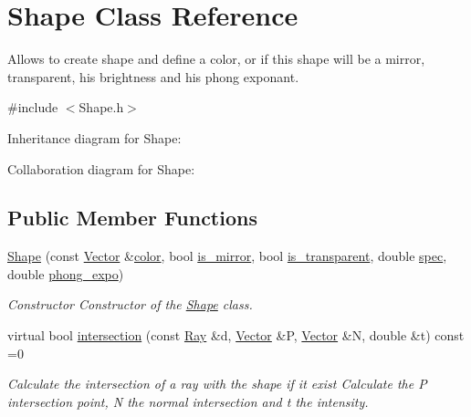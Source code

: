 \hypertarget{classShape}{}\section{Shape Class Reference}
\label{classShape}


Allows to create shape and define a color, or if this shape will be a mirror, transparent, his brightness and his phong exponant.  




{\ttfamily \#include $<$Shape.\+h$>$}



Inheritance diagram for Shape\+:


Collaboration diagram for Shape\+:
\subsection*{Public Member Functions}
\begin{DoxyCompactItemize}
\item 
\hyperlink{classShape_ac15c3dd4d56ded4efccf75f820cce913}{Shape} (const \hyperlink{classVector}{Vector} \&\hyperlink{classShape_adb97857c268315aed7861e5204c2485b}{color}, bool \hyperlink{classShape_a0ead7657fa5e4c7862fe1cedd670a9e5}{is\+\_\+mirror}, bool \hyperlink{classShape_ab8da3fc4606e66dea941ec23d25f53ef}{is\+\_\+transparent}, double \hyperlink{classShape_a60ef96ac5dea3478fdd1ab320e4c3bef}{spec}, double \hyperlink{classShape_a2556fca106f9503e6dfb4da703c28f7f}{phong\+\_\+expo})
\begin{DoxyCompactList}\small\item\em Constructor Constructor of the \hyperlink{classShape}{Shape} class. \end{DoxyCompactList}\item 
virtual bool \hyperlink{classShape_a5e193b10da347bdc1f7e9acf6e6779ba}{intersection} (const \hyperlink{classRay}{Ray} \&d, \hyperlink{classVector}{Vector} \&P, \hyperlink{classVector}{Vector} \&N, double \&t) const =0
\begin{DoxyCompactList}\small\item\em Calculate the intersection of a ray with the shape if it exist Calculate the P intersection point, N the normal intersection and t the intensity. \end{DoxyCompactList}\end{DoxyCompactItemize}

